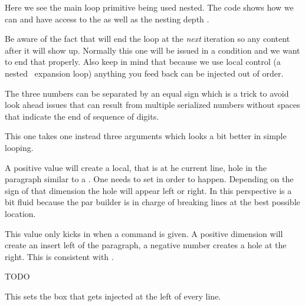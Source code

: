 \typebuffer

Here we see the main loop primitive being used nested. The code shows how we can
 and have access to the  as well as the
nesting depth .

\startpacked \getbuffer \stoppacked

Be aware of the fact that  will end the loop at the {\em next}
iteration so any content after it will show up. Normally this one will be issued
in a condition and we want to end that properly. Also keep in mind that because
we use local control (a nested \TEX\ expansion loop) anything you feed back can
be injected out of order.

The three numbers can be separated by an equal sign which is a trick to avoid
look ahead issues that can result from multiple serialized numbers without spaces
that indicate the end of sequence of digits.

\stopnewprimitive

\startnewprimitive[title={\prm {localcontrolledrepeat}}]

This one takes one instead three arguments which looks a bit better
in simple looping.

\stopnewprimitive

\startnewprimitive[title={\prm {localhangafter}}]

A positive value will create a local, that is at he current line, hole in the
paragraph similar to a . One needs to set 
in order to happen. Depending on the sign of that dimension the hole will appear
left or right. In this perspective  is a bit fluid because the
par builder is in charge of breaking lines at the best possible location.

\stopnewprimitive

\startnewprimitive[title={\prm {localhangindent}}]

This value only kicks in when a  command is given. A
positive dimension will create an insert left of the paragraph, a negative
number creates a hole at the right. This is consistent with .

\stopnewprimitive

\startnewprimitive[title={\prm {localinterlinepenalty}}]
    TODO
\stopnewprimitive

\startnewprimitive[title={\prm {localleftbox}}]

This sets the box that gets injected at the left of every line.

